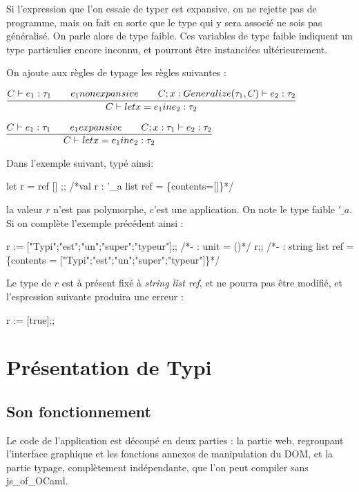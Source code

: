\documentclass[a4paper, 11pt]{article}
\begin{document}
Si l'expression que l'on essaie de typer est expansive, on ne rejette pas de programme, mais on fait en sorte que le type qui y sera associé ne sois pas généralisé. On parle alors de type faible.
Ces variables de type faible indiquent un type particulier encore inconnu, et pourront être instanciées ultérieurement.

\bigskip

\noindent
On ajoute aux règles de typage les règles suivantes :

\begin{center}
$\infer{C \vdash let x = e_1 in e_2 : \tau_2 }{{C\vdash e_1 : \tau_1\quad } {\quad e_1 non expansive\quad } {\quad C;x:Generalize(\tau_1,C)\vdash e_2 : \tau_2}}$

\bigskip

$\infer{C \vdash let x = e_1 in e_2 : \tau_2 }{{C\vdash e_1 : \tau_1\quad } {\quad e_1 expansive\quad } {\quad C;x:\tau_1\vdash e_2 : \tau_2}}$
\end{center}

Dans l'exemple suivant, typé ainsi:
\begin{OCamlEx}
let r = ref [] ;;
/*val r : '\_a list ref = \{contents=[]\}*/
\end{OCamlEx}
la valeur $r$ n'est pas polymorphe, c'est une application. On note le type faible $'\_a$.
Si on complète l'exemple précédent ainsi :
\begin{OCamlEx}
r := ["Typi";"est";"un";"super";"typeur"];;
/*- : unit = ()*/
r;;
/*- : string list ref = \{contents = ["Typi";"est";"un";"super";"typeur"]\}*/
\end{OCamlEx}
Le type de $r$ est à présent fixé à \emph{string list ref}, et ne pourra pas être modifié, et l'espression suivante produira une erreur : 
\begin{OCamlEx}
r := [true];;
\end{OCamlEx}



\newpage
\section{Présentation de Typi}

\subsection{Son fonctionnement}
Le code de l'application est découpé en deux parties : la partie web, regroupant l'interface graphique et les fonctions annexes de manipulation du DOM, et la partie typage, complètement indépendante, que l'on peut compiler sans js\_of\_OCaml.
\end{document}
